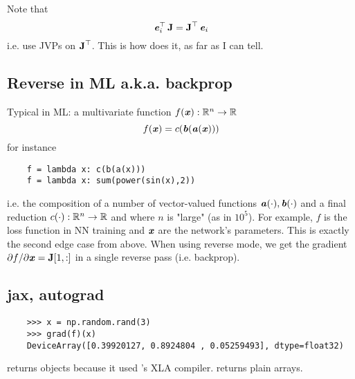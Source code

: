\documentclass[paper=a4,11pt,headsepline]{scrartcl}
\begin{document}
Note that
\begin{equation*}
    \bm{\mathit{e}}_i^\top\,\bm{\mathbf{J}} = \bm{\mathbf{J}}^\top\,\bm{\mathit{e}}_i
\end{equation*}
i.e. use JVPs on $\bm{\mathbf{J}}^\top$. This is how \jax does it, as far as I
can tell.

\subsection{Reverse in ML a.k.a. backprop}

Typical in ML: a multivariate function $f(\bm{\mathit{x}}): \mathbb R^n\rightarrow \mathbb R$
\begin{equation*}
    f(\bm{\mathit{x}}) = c(\bm{\mathit{b}}(\bm{\mathit{a}}(\bm{\mathit{x}})))
\end{equation*}
for instance
\begin{verbatim}
    f = lambda x: c(b(a(x)))
    f = lambda x: sum(power(sin(x),2))
\end{verbatim}
i.e. the composition of a number of vector-valued functions $\bm{\mathit{a}}(\cdot), \bm{\mathit{b}}(\cdot)$ and a final reduction $c(\cdot): \mathbb R^n\rightarrow \mathbb R$ and where
$n$ is "large" (as in $10^5$). For example, $f$ is the loss function in NN
training and $\bm{\mathit{x}}$ are the network's parameters. This is exactly the second
edge case from above. When using reverse mode, we get the gradient $\partial f/\partial \bm{\mathit{x}} = \bm{\mathbf{J}}[1,:]$ in a single reverse pass (i.e. backprop).

\subsection{jax, autograd}

\begin{verbatim}
    >>> x = np.random.rand(3)
    >>> grad(f)(x)
    DeviceArray([0.39920127, 0.8924804 , 0.05259493], dtype=float32)
\end{verbatim}

\jax returns  objects because it used \tf's XLA compiler.
\autograd returns plain \numpy arrays.

\subsection{\pytorch}
\end{document}
